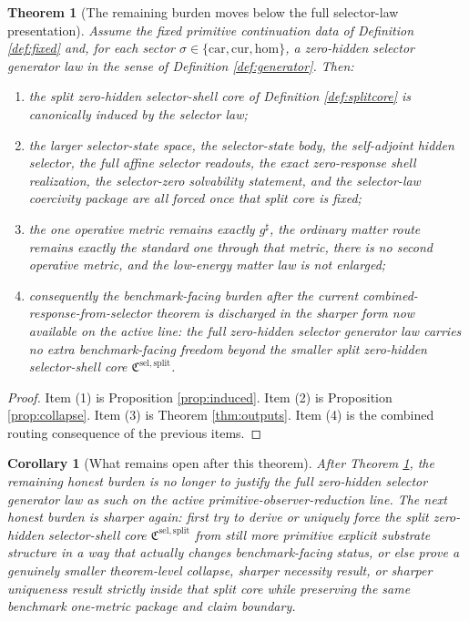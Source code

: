 \documentclass[11pt]{article}
\newcommand{\CompletedMetric}{g^{\sharp}}
\newcommand{\SelectorCore}{\mathfrak C^{\mathrm{sel,split}}}
\newcommand{\Car}{\mathrm{car}}
\newcommand{\Cur}{\mathrm{cur}}
\newcommand{\Hom}{\mathrm{hom}}
\newtheorem{corollary}{Corollary}
\newtheorem{theorem}{Theorem}
\begin{document}
\begin{theorem}[The remaining burden moves below the full selector-law presentation]
\label{thm:main}
Assume the fixed primitive continuation data of Definition \ref{def:fixed} and, for each sector \(\sigma\in\{\Car,\Cur,\Hom\}\), a zero-hidden selector generator law in the sense of Definition \ref{def:generator}. Then:
\begin{enumerate}
    \item the split zero-hidden selector-shell core of Definition \ref{def:splitcore} is canonically induced by the selector law;
    \item the larger selector-state space, the selector-state body, the self-adjoint hidden selector, the full affine selector readouts, the exact zero-response shell realization, the selector-zero solvability statement, and the selector-law coercivity package are all forced once that split core is fixed;
    \item the one operative metric remains exactly \(\CompletedMetric\), the ordinary matter route remains exactly the standard one through that metric, there is no second operative metric, and the low-energy matter law is not enlarged;
    \item consequently the benchmark-facing burden after the current combined-response-from-selector theorem is discharged in the sharper form now available on the active line: the full zero-hidden selector generator law carries no extra benchmark-facing freedom beyond the smaller split zero-hidden selector-shell core \(\SelectorCore\).
\end{enumerate}
\end{theorem}

\begin{proof}
Item (1) is Proposition \ref{prop:induced}. Item (2) is Proposition \ref{prop:collapse}. Item (3) is Theorem \ref{thm:outputs}. Item (4) is the combined routing consequence of the previous items.
\end{proof}

\begin{corollary}[What remains open after this theorem]
\label{cor:next}
After Theorem \ref{thm:main}, the remaining honest burden is no longer to justify the full zero-hidden selector generator law as such on the active primitive-observer-reduction line. The next honest burden is sharper again: first try to derive or uniquely force the split zero-hidden selector-shell core \(\SelectorCore\) from still more primitive explicit substrate structure in a way that actually changes benchmark-facing status, or else prove a genuinely smaller theorem-level collapse, sharper necessity result, or sharper uniqueness result strictly inside that split core while preserving the same benchmark one-metric package and claim boundary.
\end{corollary}
\end{document}
